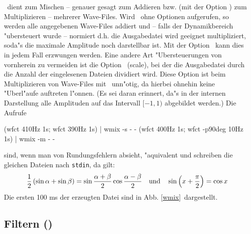 \wmix\ dient zum Mischen -- genauer gesagt zum Addieren bzw. (mit der
Option ) zum Multiplizieren -- mehrerer Wave-Files.
Wird \wmix\ ohne Optionen aufgerufen, so werden alle angegebenen
Wave-Files addiert und -- falls der Dynamikbereich "ubersteuert
wurde -- normiert d.h. die Ausgabedatei wird geeignet multipliziert,
soda"s die maximale Amplitude noch darstellbar ist. Mit der
Option \ kann dies in jedem Fall erzwungen werden.
Eine andere Art "Ubersteuerungen von vornherein zu vermeiden ist
die Option \ (scale), bei der die Ausgabedatei durch die
Anzahl der eingelesenen Dateien dividiert wird. 
Diese Option ist beim Multiplizieren von Wave-Files mit \ 
unn"otig, da hierbei ohnehin keine "Uberl"aufe auftreten l"onnen.
(Es sei daran erinnert, da"s in der internen Darstellung alle
Amplituden auf das Intervall $[-1,1)$ abgebildet werden.)
Die Aufrufe

{\btxt
  (wfct 410Hz 1s; wfct 390Hz 1s) | wmix -s - - \txtund 
  (wfct 400Hz 1s; wfct -p90deg 10Hz 1s) | wmix -m - - 
\etxt}

\noindent sind, wenn man von Rundungsfehlern absieht, "aquivalent
und schreiben die gleichen Dateien nach {\tt stdin}, da gilt:
  {$$ {1 \over 2} \, (\sin \alpha + \sin \beta) = 
  \sin {\alpha + \beta \over 2} \cos {\alpha - \beta \over 2}
  \quad\mbox{und}\quad
  \sin \left(x+{\pi \over 2}\right) = \cos x $$}
\noindent Die ersten 100 ms der erzeugten Datei sind in Abb. \ref{wmix}\ 
dargestellt.



\subsection{Filtern (\wflt)}



